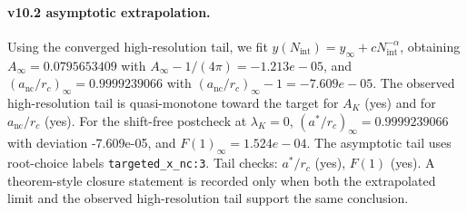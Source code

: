 \paragraph{v10.2 asymptotic extrapolation.}
Using the converged high-resolution tail, we fit $y(N_{\mathrm{int}})=y_{\infty}+cN_{\mathrm{int}}^{-\alpha}$, obtaining $A_\infty=0.0795653409$ with $A_\infty-1/(4\pi)=-1.213e-05$, and $(a_{\mathrm{nc}}/r_c)_\infty=0.9999239066$ with $(a_{\mathrm{nc}}/r_c)_\infty-1=-7.609e-05$. The observed high-resolution tail is quasi-monotone toward the target for $A_K$ (yes) and for $a_{\mathrm{nc}}/r_c$ (yes). For the shift-free postcheck at $\lambda_K=0$, $(a^*/r_c)_\infty=0.9999239066$ with deviation -7.609e-05, and $F(1)_\infty=1.524e-04$. The asymptotic tail uses root-choice labels \texttt{targeted_x_nc:3}. Tail checks: $a^*/r_c$ (yes), $F(1)$ (yes). A theorem-style closure statement is recorded only when both the extrapolated limit and the
observed high-resolution tail support the same conclusion.
